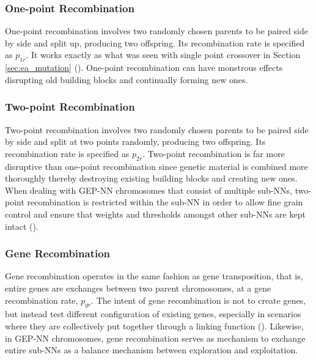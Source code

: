 \subsubsection{One-point Recombination}
One-point recombination involves two randomly chosen parents to be paired side by side and split up, producing two offspring. Its recombination rate is specified as \textit{$p_{1r}$}. It works exactly as what was seen with single point crossover in Section \ref{sec:ea_mutation} (\cite{ferreira2006gene}). One-point recombination can have monstrous effects disrupting old building blocks and continually forming new ones.

\subsubsection{Two-point Recombination}
Two-point recombination involves two randomly chosen parents to be paired side by side and split at two points randomly, producing two offspring. Its recombination rate is specified as \textit{$p_{2r}$}. Two-point recombination is far more disruptive than one-point recombination since genetic material is combined more thoroughly thereby destroying existing building blocks and creating new ones. When dealing with GEP-NN chromosomes that consist of multiple sub-NNs, two-point recombination is restricted within the sub-NN in order to allow fine grain control and ensure that weights and thresholds amongst other sub-NNs are kept intact (\cite{ferreira2006gene}).

\subsubsection{Gene Recombination}
Gene recombination operates in the same fashion as gene transposition, that is, entire genes are exchanges between two parent chromosomes, at a gene recombination rate, \textit{$p_{gr}$}. The intent of gene recombination is not to create genes, but instead test different configuration of existing genes, especially in scenarios where they are collectively put together through a linking function (\cite{ferreira2006gene}). Likewise, in GEP-NN chromosomes, gene recombination serves as mechanism to exchange entire sub-NNs as a balance mechanism between exploration and exploitation.

